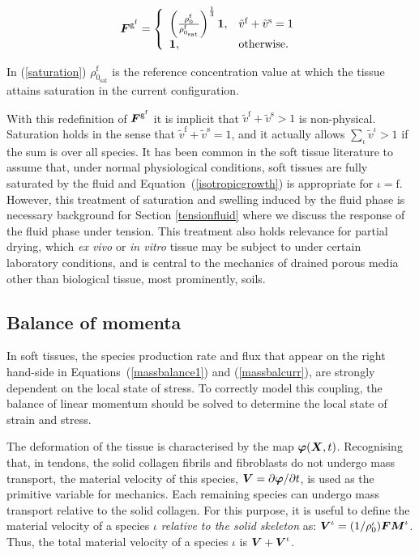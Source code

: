 \begin{equation}
\mbox{\boldmath$ F$}^{\mathrm{g}^\mathrm{f}} = \left\{ \begin{array}{ll}  \left(
\frac{\rho_0^\mathrm{f}}{\rho_{0_{\mathrm{sat}}}^\mathrm{f}} \right)^
{\frac{1}{3}}{\bf 1},&
\tilde{v}^\mathrm{f} + \tilde{v}^\mathrm{s} = 1 \\ {\bf 1},& \mathrm{otherwise.}
\end{array}\right.
\label{saturation}
\end{equation}

\noindent In (\ref{saturation}) $\rho_{0_{\mathrm{sat}}}^\mathrm{f}$
is the reference concentration value at which the tissue attains saturation
in the current configuration.

With this redefinition of $\mbox{\boldmath$ F$}^{\mathrm{g}^\mathrm{f}}$ it is implicit
that $\tilde{v}^\mathrm{f} + \tilde{v}^\mathrm{s} > 1$ is
non-physical. Saturation holds in the sense that $\tilde{v}^\mathrm{f} +
\tilde{v}^\mathrm{s} = 1$, and it actually allows $\sum_\iota
\tilde{v}^\iota > 1$ if the sum is over all species. It has been
common in the soft tissue literature to assume that, 
under normal physiological 
conditions, soft tissues are fully saturated by the fluid and
\mbox{Equation~(\ref{isotropicgrowth})} is appropriate for $\iota =
\mathrm{f}$. However, this treatment of saturation and swelling
induced by the fluid phase is necessary background for Section
\ref{tensionfluid} where we 
discuss the response of the fluid phase under tension. This treatment
also holds relevance for partial drying,
which \emph{ex vivo} or \emph{in vitro} tissue may be subject to under
certain laboratory conditions, and is central to the mechanics of
drained porous media other than biological tissue, most prominently,
soils. 

\subsection{Balance of momenta}
\label{bomom}

In soft tissues, the species production rate and flux that appear on
the right hand-side in Equations~(\ref{massbalance1}) and
(\ref{massbalcurr}), are strongly 
dependent on the local state of stress. To correctly model this
coupling, the balance of linear momentum should be solved to determine
the local state of strain and stress.

The deformation of the tissue is characterised by the map
$\mbox{\boldmath$\varphi$}(\mbox{\boldmath$ X$},t)$. Recognising that, in tendons, the solid collagen
fibrils and fibroblasts do not undergo mass
transport, the material velocity of this species, $\mbox{\boldmath$ V$} =
\partial\mbox{\boldmath$\varphi$}/\partial t$, is used as the primitive variable for
mechanics. Each remaining species can undergo mass transport relative
to the solid collagen. For this purpose, it is useful to define the
material velocity of a 
species $\iota$ \emph{relative to the solid skeleton} as: $\mbox{\boldmath$ V$}^\iota =
(1/\rho_0^\iota)\mbox{\boldmath$ F$}\mbox{\boldmath$ M$}^\iota$. Thus, the total material velocity of a
species $\iota$ is $\mbox{\boldmath$ V$}+\mbox{\boldmath$ V$}^\iota$.

